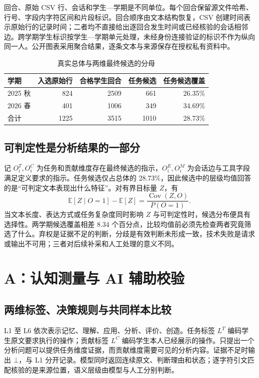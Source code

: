 \documentclass[withoutpreface,bwprint]{cumcmthesis}
\newcommand{\E}{\mathbb{E}}
\newcommand{\Cov}{\operatorname{Cov}}
\begin{document}
回合、原始 CSV 行、会话和学生—学期是不同单位。每个回合保留源文件哈希、行号、字段内字符区间和片段标识。回合顺序由文本结构恢复，CSV 创建时间表示原始行的记录时间；二者均不直接给出逐回合发生时间或已经核验的会话相邻边。跨学期学生标识按学生—学期单元处理，未经身份连接验证的标识不作为纵向同一人。公开图表采用聚合结果，逐条文本与来源保存在授权私有资料中。

\begin{table}[htbp]\centering\small
\caption{真实总体与两维最终候选的分母}\label{tab:population}
\begin{tabular}{@{}lrrrr@{}}\toprule
学期 & 入选原始行 & 合格学生回合 & 任务候选 & 任务候选覆盖\\\midrule
2025 秋 & 824 & 2509 & 661 & 26.35\%\\
2026 春 & 401 & 1006 & 349 & 34.69\%\\
合计 & 1225 & 3515 & 1010 & 28.73\%\\\bottomrule
\end{tabular}
\end{table}

\subsection{可判定性是分析结果的一部分}
记 $O_i^T,O_i^C$ 为任务和贡献维度存在最终候选的指示，$O_i^E,O_i^M$ 为会话边与工具字段满足定义要求的指示。任务候选仅占总体的 28.73\%，因此候选中的层级均值回答的是“可判定文本表现出什么特征”。对有界目标量 $Z$，有
\begin{equation}\label{eq:selection}
\E[Z\mid O=1]-\E[Z]=\frac{\Cov(Z,O)}{P(O=1)}.
\end{equation}
当文本长度、表达方式或任务复杂度同时影响 $Z$ 与可判定性时，候选分布便具有选择性。两学期候选覆盖相差 8.34 个百分点，比较均值前必须先检查两者究竟筛选了什么。弃权是证据不足的判断，分歧是有效判断未形成一致，技术失败是请求或输出不可用；三者对后续补采和人工处理的意义不同。

\FinalSelectionResults{}

\section{A：认知测量与 AI 辅助校验}
\subsection{两维标签、决策规则与共同样本比较}
L1 至 L6 依次表示记忆、理解、应用、分析、评价、创造。任务标签 $L^T$ 编码学生原文要求执行的操作；贡献标签 $L^C$ 编码学生本人已经展示的操作。只提出一个分析问题可以提供任务维度证据，而贡献维度需要可见的分析内容。证据不足时输出 $\bot$，与 L1 分开记录。模型同时返回连续原文、判断理由和状态；逐字符引文匹配核验的是来源位置，语义层级由模型与人工分别判断。
\end{document}
